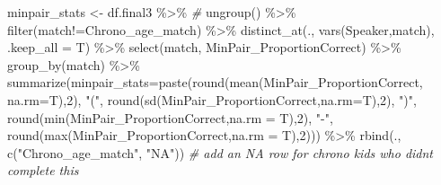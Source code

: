 \documentclass[
]{article}
\newenvironment{Shaded}{\begin{snugshade}}{\end{snugshade}}
\newcommand{\AttributeTok}[1]{\textcolor[rgb]{0.77,0.63,0.00}{#1}}
\newcommand{\CommentTok}[1]{\textcolor[rgb]{0.56,0.35,0.01}{\textit{#1}}}
\newcommand{\DecValTok}[1]{\textcolor[rgb]{0.00,0.00,0.81}{#1}}
\newcommand{\FunctionTok}[1]{\textcolor[rgb]{0.00,0.00,0.00}{#1}}
\newcommand{\NormalTok}[1]{#1}
\newcommand{\OtherTok}[1]{\textcolor[rgb]{0.56,0.35,0.01}{#1}}
\newcommand{\SpecialCharTok}[1]{\textcolor[rgb]{0.00,0.00,0.00}{#1}}
\newcommand{\StringTok}[1]{\textcolor[rgb]{0.31,0.60,0.02}{#1}}
\begin{document}
\begin{Shaded}
\begin{Highlighting}[]
\NormalTok{minpair\_stats }\OtherTok{\textless{}{-}}\NormalTok{ df.final3 }\SpecialCharTok{\%\textgreater{}\%} \CommentTok{\# }
  \FunctionTok{ungroup}\NormalTok{() }\SpecialCharTok{\%\textgreater{}\%}
  \FunctionTok{filter}\NormalTok{(match}\SpecialCharTok{!=}\StringTok{\textquotesingle{}Chrono\_age\_match\textquotesingle{}}\NormalTok{) }\SpecialCharTok{\%\textgreater{}\%}
  \FunctionTok{distinct\_at}\NormalTok{(., }\FunctionTok{vars}\NormalTok{(Speaker,match), }\AttributeTok{.keep\_all =}\NormalTok{ T) }\SpecialCharTok{\%\textgreater{}\%}
  \FunctionTok{select}\NormalTok{(match, MinPair\_ProportionCorrect) }\SpecialCharTok{\%\textgreater{}\%}
  \FunctionTok{group\_by}\NormalTok{(match) }\SpecialCharTok{\%\textgreater{}\%}
  \FunctionTok{summarize}\NormalTok{(}\AttributeTok{minpair\_stats=}\FunctionTok{paste}\NormalTok{(}\FunctionTok{round}\NormalTok{(}\FunctionTok{mean}\NormalTok{(MinPair\_ProportionCorrect, }\AttributeTok{na.rm=}\NormalTok{T),}\DecValTok{2}\NormalTok{),}
                                \StringTok{"("}\NormalTok{,}
                                \FunctionTok{round}\NormalTok{(}\FunctionTok{sd}\NormalTok{(MinPair\_ProportionCorrect,}\AttributeTok{na.rm=}\NormalTok{T),}\DecValTok{2}\NormalTok{),}
                                \StringTok{")"}\NormalTok{,}
                                \FunctionTok{round}\NormalTok{(}\FunctionTok{min}\NormalTok{(MinPair\_ProportionCorrect,}\AttributeTok{na.rm =}\NormalTok{ T),}\DecValTok{2}\NormalTok{),}
                                \StringTok{"{-}"}\NormalTok{,}
                                \FunctionTok{round}\NormalTok{(}\FunctionTok{max}\NormalTok{(MinPair\_ProportionCorrect,}\AttributeTok{na.rm =}\NormalTok{ T),}\DecValTok{2}\NormalTok{))) }\SpecialCharTok{\%\textgreater{}\%}
  \FunctionTok{rbind}\NormalTok{(., }\FunctionTok{c}\NormalTok{(}\StringTok{"Chrono\_age\_match"}\NormalTok{, }\StringTok{"NA"}\NormalTok{)) }\CommentTok{\#  add an NA row for chrono kids who didn\textquotesingle{}t complete this}



\end{Highlighting}
\end{Shaded}
\end{document}
